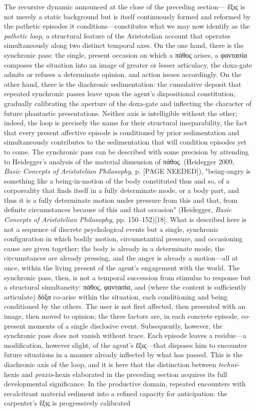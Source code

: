 \documentclass{article}
\begin{document}
The recursive dynamic announced at the close of the preceding section— ἕξις is not merely a static background but is itself continuously formed and reformed by the pathetic episodes it conditions—constitutes what we may now identify as the \textit{pathetic loop}, a structural feature of the Aristotelian account that operates simultaneously along two distinct temporal axes. On the one hand, there is the synchronic pass: the single, present occasion on which a πάθος arises, a φαντασία composes the situation into an image of greater or lesser articulacy, the doxa-gate admits or refuses a determinate opinion, and action issues accordingly. On the other hand, there is the diachronic sedimentation: the cumulative deposit that repeated synchronic passes leave upon the agent's dispositional constitution, gradually calibrating the aperture of the doxa-gate and inflecting the character of future phantastic presentations. Neither axis is intelligible without the other; indeed, the loop is precisely the name for their structural inseparability, the fact that every present affective episode is conditioned by prior sedimentation and simultaneously contributes to the sedimentation that will condition episodes yet to come. The synchronic pass can be described with some precision by attending to Heidegger's analysis of the material dimension of πάθος. (Heidegger 2009, \textit{Basic Concepts of Aristotelian Philosophy}, p. [PAGE NEEDED]), "being-angry is something like a being-in-motion of the body constituted thus and so, of a corporeality that finds itself in a fully determinate mode, or a body part, and thus it is a fully determinate motion under pressure from this and that, from definite circumstances because of this and that occasion" (Heidegger, \textit{Basic Concepts of Aristotelian Philosophy}, pp. 150–152)[18]. What is described here is not a sequence of discrete psychological events but a single, synchronic configuration in which bodily motion, circumstantial pressure, and occasioning cause are given together; the body is already in a determinate mode, the circumstances are already pressing, and the anger is already a motion—all at once, within the living present of the agent's engagement with the world. The synchronic pass, then, is not a temporal succession from stimulus to response but a structural simultaneity: πάθος, φαντασία, and (where the content is sufficiently articulate) δόξα co-arise within the situation, each conditioning and being conditioned by the others. The user is not first affected, then presented with an image, then moved to opinion; the three factors are, in each concrete episode, co-present moments of a single disclosive event. Subsequently, however, the synchronic pass does not vanish without trace. Each episode leaves a residue—a modification, however slight, of the agent's ἕξις—that disposes him to encounter future situations in a manner already inflected by what has passed. This is the diachronic axis of the loop, and it is here that the distinction between \textit{technē}-hexis and \textit{praxis}-hexis elaborated in the preceding section acquires its full developmental significance. In the productive domain, repeated encounters with recalcitrant material sediment into a refined capacity for anticipation: the carpenter's ἕξις is progressively calibrated 
\end{document}
